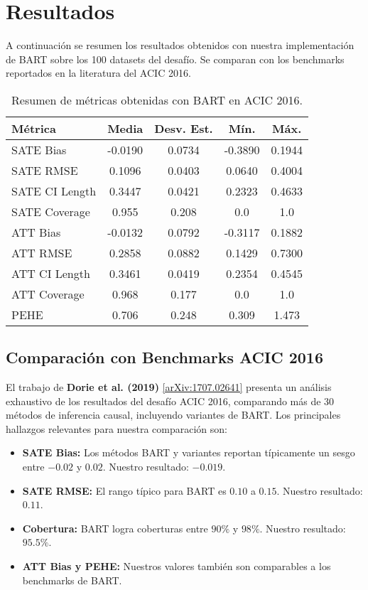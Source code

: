 \documentclass[a4paper,12pt]{article}
\begin{document}
\section{Resultados}
A continuación se resumen los resultados obtenidos con nuestra implementación de BART sobre los 100 datasets del desafío. Se comparan con los benchmarks reportados en la literatura del ACIC 2016.

\begin{table}[h!]
\centering
\begin{tabular}{lcccc}
\toprule
Métrica & Media & Desv. Est. & Mín. & Máx. \\
\midrule
SATE Bias & -0.0190 & 0.0734 & -0.3890 & 0.1944 \\
SATE RMSE & 0.1096 & 0.0403 & 0.0640 & 0.4004 \\
SATE CI Length & 0.3447 & 0.0421 & 0.2323 & 0.4633 \\
SATE Coverage & 0.955 & 0.208 & 0.0 & 1.0 \\
ATT Bias & -0.0132 & 0.0792 & -0.3117 & 0.1882 \\
ATT RMSE & 0.2858 & 0.0882 & 0.1429 & 0.7300 \\
ATT CI Length & 0.3461 & 0.0419 & 0.2354 & 0.4545 \\
ATT Coverage & 0.968 & 0.177 & 0.0 & 1.0 \\
PEHE & 0.706 & 0.248 & 0.309 & 1.473 \\
\bottomrule
\end{tabular}
\caption{Resumen de métricas obtenidas con BART en ACIC 2016.}
\end{table}

\subsection{Comparación con Benchmarks ACIC 2016}
El trabajo de \textbf{Dorie et al. (2019)} \cite{dorie2019automated} \href{https://arxiv.org/abs/1707.02641}{[arXiv:1707.02641]} presenta un análisis exhaustivo de los resultados del desafío ACIC 2016, comparando más de 30 métodos de inferencia causal, incluyendo variantes de BART. Los principales hallazgos relevantes para nuestra comparación son:

\begin{itemize}
    \item \textbf{SATE Bias:} Los métodos BART y variantes reportan típicamente un sesgo entre $-0.02$ y $0.02$. Nuestro resultado: $-0.019$.
    \item \textbf{SATE RMSE:} El rango típico para BART es $0.10$ a $0.15$. Nuestro resultado: $0.11$.
    \item \textbf{Cobertura:} BART logra coberturas entre $90\%$ y $98\%$. Nuestro resultado: $95.5\%$.
    \item \textbf{ATT Bias y PEHE:} Nuestros valores también son comparables a los benchmarks de BART.
\end{itemize}
\end{document}
